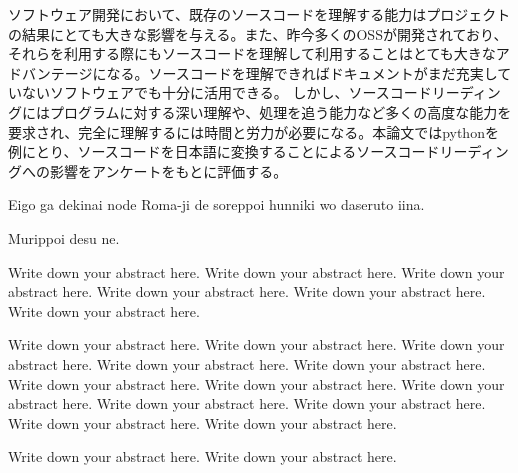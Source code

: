 


\begin{jabstract}

ソフトウェア開発において、既存のソースコードを理解する能力はプロジェクトの結果にとても大きな影響を与える。また、昨今多くのOSSが開発されており、それらを利用する際にもソースコードを理解して利用することはとても大きなアドバンテージになる。ソースコードを理解できればドキュメントがまだ充実していないソフトウェアでも十分に活用できる。
しかし、ソースコードリーディングにはプログラムに対する深い理解や、処理を追う能力など多くの高度な能力を要求され、完全に理解するには時間と労力が必要になる。本論文ではpythonを例にとり、ソースコードを日本語に変換することによるソースコードリーディングへの影響をアンケートをもとに評価する。

\end{jabstract}



\begin{eabstract}

Eigo ga dekinai node Roma-ji de soreppoi hunniki wo daseruto iina.

Murippoi desu ne.

Write down your abstract here. Write down your abstract here. Write down your abstract here. Write down your abstract here. Write down your abstract here. Write down your abstract here.

 Write down your abstract here. Write down your abstract here. Write down your abstract here. Write down your abstract here. Write down your abstract here. Write down your abstract here. Write down your abstract here. Write down your abstract here. Write down your abstract here. Write down your abstract here. Write down your abstract here. Write down your abstract here.
 
Write down your abstract here. Write down your abstract here.

\end{eabstract}
